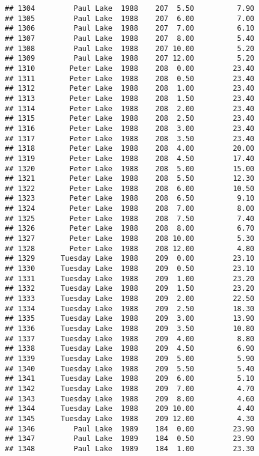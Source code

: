 \documentclass[
]{article}
\begin{document}
\begin{verbatim}
## 1304         Paul Lake  1988    207  5.50          7.90
## 1305         Paul Lake  1988    207  6.00          7.00
## 1306         Paul Lake  1988    207  7.00          6.10
## 1307         Paul Lake  1988    207  8.00          5.40
## 1308         Paul Lake  1988    207 10.00          5.20
## 1309         Paul Lake  1988    207 12.00          5.20
## 1310        Peter Lake  1988    208  0.00         23.40
## 1311        Peter Lake  1988    208  0.50         23.40
## 1312        Peter Lake  1988    208  1.00         23.40
## 1313        Peter Lake  1988    208  1.50         23.40
## 1314        Peter Lake  1988    208  2.00         23.40
## 1315        Peter Lake  1988    208  2.50         23.40
## 1316        Peter Lake  1988    208  3.00         23.40
## 1317        Peter Lake  1988    208  3.50         23.40
## 1318        Peter Lake  1988    208  4.00         20.00
## 1319        Peter Lake  1988    208  4.50         17.40
## 1320        Peter Lake  1988    208  5.00         15.00
## 1321        Peter Lake  1988    208  5.50         12.30
## 1322        Peter Lake  1988    208  6.00         10.50
## 1323        Peter Lake  1988    208  6.50          9.10
## 1324        Peter Lake  1988    208  7.00          8.00
## 1325        Peter Lake  1988    208  7.50          7.40
## 1326        Peter Lake  1988    208  8.00          6.70
## 1327        Peter Lake  1988    208 10.00          5.30
## 1328        Peter Lake  1988    208 12.00          4.80
## 1329      Tuesday Lake  1988    209  0.00         23.10
## 1330      Tuesday Lake  1988    209  0.50         23.10
## 1331      Tuesday Lake  1988    209  1.00         23.20
## 1332      Tuesday Lake  1988    209  1.50         23.20
## 1333      Tuesday Lake  1988    209  2.00         22.50
## 1334      Tuesday Lake  1988    209  2.50         18.30
## 1335      Tuesday Lake  1988    209  3.00         13.90
## 1336      Tuesday Lake  1988    209  3.50         10.80
## 1337      Tuesday Lake  1988    209  4.00          8.80
## 1338      Tuesday Lake  1988    209  4.50          6.90
## 1339      Tuesday Lake  1988    209  5.00          5.90
## 1340      Tuesday Lake  1988    209  5.50          5.40
## 1341      Tuesday Lake  1988    209  6.00          5.10
## 1342      Tuesday Lake  1988    209  7.00          4.70
## 1343      Tuesday Lake  1988    209  8.00          4.60
## 1344      Tuesday Lake  1988    209 10.00          4.40
## 1345      Tuesday Lake  1988    209 12.00          4.30
## 1346         Paul Lake  1989    184  0.00         23.90
## 1347         Paul Lake  1989    184  0.50         23.90
## 1348         Paul Lake  1989    184  1.00         23.30

\end{verbatim}
\end{document}
